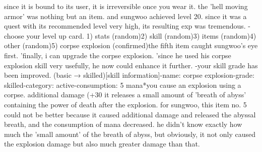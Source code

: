 since it is bound to its user, it is irreversible once you wear it.
 the 'hell moving armor' was nothing but an item.
 and sungwoo achieved level 20.
 since it was a quest with its recommended level very high, its resulting exp was tremendous.
-choose your level up card.
1) stats (random)2) skill (random)3) items (random)4) other (random)5) corpse explosion (confirmed)the fifth item caught sungwoo's eye first.
 'finally, i can upgrade the corpse explosion.
'since he used his corpse explosion skill very usefully, he now could enhance it further.
-your skill grade has been improved.
 (basic → skilled)[skill information]-name: corpse explosion-grade: skilled-category: active-consumption: 5 mana*you cause an explosion using a corpse.
 additional damage (+30%
 it releases a small amount of 'breath of abyss' containing the power of death after the explosion.
for sungwoo, this item no.
 5 could not be better because it caused additional damage and released the abyssal breath, and the consumption of mana decreased.
he didn't know exactly how much the 'small amount' of the breath of abyss, but obviously, it not only caused the explosion damage but also much greater damage than that.
 
